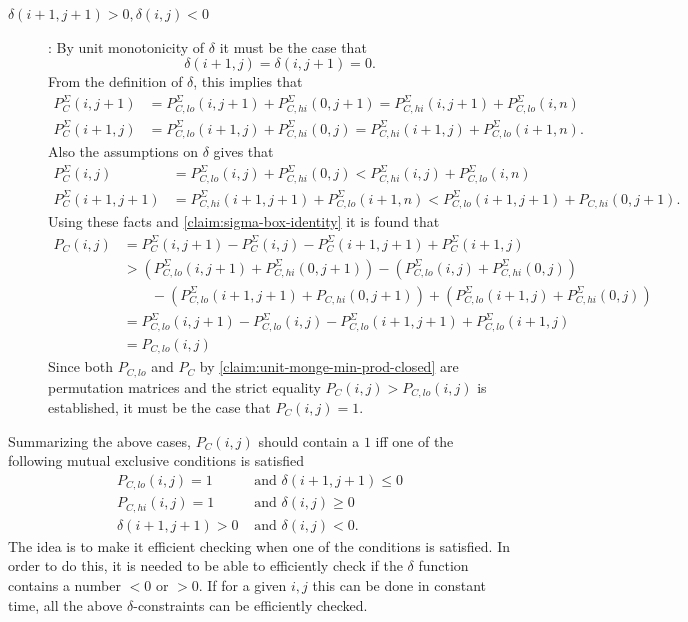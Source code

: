 \documentclass[twoside,11pt,openright]{report}
\begin{document}
\begin{description}
  \item[$\delta(i + 1, j + 1) > 0, \delta(i, j) < 0$]: By unit monotonicity of $\delta$ it must be the case that
  \[
    \delta(i + 1, j) = \delta(i, j + 1) = 0.
  \]
  From the definition of $\delta$, this implies that
  \begin{align*}
    P_C^{\Sigma}(i, j + 1) &= P_{C,lo}^{\Sigma}(i, j + 1) + P_{C,hi}^{\Sigma}(0, j + 1) = P_{C,hi}^{\Sigma}(i, j + 1) + P_{C,lo}^{\Sigma}(i, n) \\
    P_C^{\Sigma}(i + 1, j) &= P_{C,lo}^{\Sigma}(i + 1, j) + P_{C,hi}^{\Sigma}(0, j) = P_{C,hi}^{\Sigma}(i + 1, j) + P_{C,lo}^{\Sigma}(i + 1, n).
  \end{align*}
  Also the assumptions on $\delta$ gives that
  \begin{align*}
    P_C^\Sigma(i, j) &= P_{C,lo}^{\Sigma}(i, j) + P_{C,hi}^{\Sigma}(0, j) < P_{C,hi}^{\Sigma}(i, j) + P_{C,lo}^{\Sigma}(i, n) \\
    P_C^{\Sigma}(i + 1, j + 1) &= P_{C,hi}^{\Sigma}(i + 1, j + 1) + P_{C,lo}^{\Sigma}(i + 1, n) < P_{C,lo}^{\Sigma}(i + 1, j + 1) + P_{C,hi}(0, j + 1).
  \end{align*}
  Using these facts and \cref{claim:sigma-box-identity} it is found that
  \begin{align*}
    P_C(i, j) &= P_C^{\Sigma}(i, j + 1) - P_C^{\Sigma}(i, j) - P_C^{\Sigma}(i + 1, j + 1) + P_C^{\Sigma}(i + 1, j) \\
    &> (P_{C,lo}^{\Sigma}(i, j + 1) + P_{C,hi}^{\Sigma}(0, j + 1)) - (P_{C,lo}^{\Sigma}(i, j) + P_{C,hi}^{\Sigma}(0, j)) \\&\quad\quad - (P_{C,lo}^{\Sigma}(i + 1, j + 1) + P_{C,hi}(0, j + 1)) + (P_{C,lo}^{\Sigma}(i + 1, j) + P_{C,hi}^{\Sigma}(0, j)) \\
    &= P_{C,lo}^{\Sigma}(i, j + 1) - P_{C,lo}^{\Sigma}(i, j) - P_{C,lo}^{\Sigma}(i + 1, j + 1) + P_{C,lo}^{\Sigma}(i + 1, j) \\
    &= P_{C,lo}(i, j)
  \end{align*}
  Since both $P_{C,lo}$ and $P_C$ by \cref{claim:unit-monge-min-prod-closed} are permutation matrices and the strict equality $P_C(i, j) > P_{C,lo}(i, j)$ is established, it must be the case that $P_C(i, j) = 1$.
\end{description}
Summarizing the above cases, $P_C(i, j)$ should contain a $1$ iff one of the following mutual exclusive conditions is satisfied
\begin{align}
  P_{C,lo}(i, j) = 1 &\text{ and } \delta(i + 1, j + 1) \leq 0 \\
  P_{C,hi}(i, j) = 1 &\text{ and } \delta(i, j) \geq 0 \\
  \delta(i + 1, j + 1) > 0 &\text{ and } \delta(i, j) < 0.
\end{align}
The idea is to make it efficient checking when one of the conditions is satisfied. In order to do this, it is needed to be able to efficiently check if the $\delta$ function contains a number $< 0$ or $> 0$. If for a given $i, j$ this can be done in constant time, all the above $\delta$-constraints can be efficiently checked.
\end{document}
